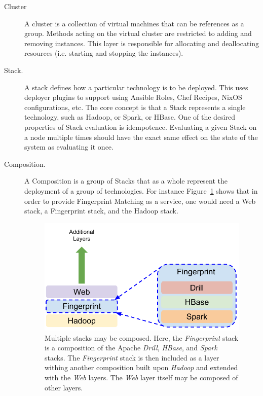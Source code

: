 \documentclass[9pt,twocolumn,twoside]{styles/osajnl}
\begin{document}
\begin{description}

\item[Cluster] A cluster is a collection of virtual machines that can
  be references as a group. Methods acting on the virtual cluster are
  restricted to adding and removing instances. This layer is
  responsible for allocating and deallocating resources (i.e. starting
  and stopping the instances).


\item[Stack.] A stack defines how a particular technology is to be
  deployed. This uses deployer plugins to support using Ansible Roles,
  Chef Recipes, NixOS configurations, etc. The core concept is that a
  Stack represents a single technology, such as Hadoop, or Spark, or
  HBase. One of the desired properties of Stack evaluation is
  idempotence. Evaluating a given Stack on a node multiple times
  should have the exact same effect on the state of the system as
  evaluating it once.


\item[Composition.] A Composition is a group of Stacks that as a whole
  represent the deployment of a group of technologies. For instance
  Figure~\ref{F:stack-composition} shows that in order to provide
  Fingerprint Matching as a service, one would need a Web stack, a
  Fingerprint stack, and the Hadoop stack.

  \begin{figure}
    \centering
    \includegraphics[width=1\columnwidth]{images/cloudmesh-stack-composition.pdf}
    \caption{Multiple stacks may be composed. Here, the
      {\it Fingerprint} stack is a composition of the Apache
      {\it Drill}, {\it HBase}, and {\it Spark}
      stacks. The {\it Fingerprint} stack is then included as a layer withing
      another composition built upon {\it Hadoop} and extended with the
      {\it Web} layers. The {\it Web} layer itself may be composed
      of other layers.
      \label{F:stack-composition}}
  \end{figure}


\end{description}
\end{document}
